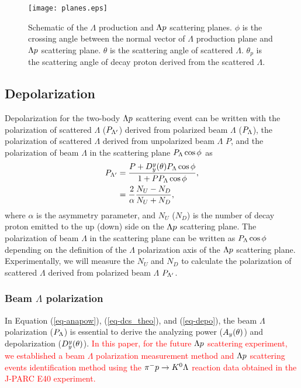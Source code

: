 \begin{figure}[h!]
 \begin{center}
   \texttt{[image: planes.eps]}
   \caption{Schematic of the $\Lambda$ production and $\Lambda p$ scattering planes. $\phi$ is the crossing angle between the normal vector of $\Lambda$ production plane and $\Lambda p$ scattering plane. $\theta$ is the scattering angle of scattered $\Lambda$. $\theta_{p}$ is the scattering angle of decay proton derived from the scattered $\Lambda$.}
   \label{fig-planes}
 \end{center}
\end{figure}

\subsection{Depolarization}
\label{sec-depo}

Depolarization for the two-body $\Lambda p$ scattering event can be written with the polarization of scattered $\Lambda$ ($P_{\Lambda'}$) derived from polarized beam $\Lambda$ ($P_{\Lambda}$), the polarization of scattered $\Lambda$ derived from unpolarized beam $\Lambda$ $P$, and the polarization of beam $\Lambda$ in the scattering plane $P_{\Lambda}\cos{\phi}$ as
\begin{align}
  P_{\Lambda'} &= \frac{P+D^{y}_{y}(\theta)P_{\Lambda}\cos{\phi}}{1+PP_{\Lambda}\cos{\phi}}, \\
  &= \frac{2}{\alpha} \frac{N_{U}-N_{D}}{N_{U}+N_{D}},
  \label{eq-depo}
\end{align}
where $\alpha$ is the asymmetry parameter, and $N_{U}$ ($N_{D}$) is the number of decay proton emitted to the up (down) side on the $\Lambda p$ scattering plane. The polarization of beam $\Lambda$ in the scattering plane can be written as $P_{\Lambda}\cos{\phi}$ depending on the definition of the $\Lambda$ polarization axis of the $\Lambda p$ scattering plane. Experimentally, we will measure the $N_{U}$ and $N_{D}$ to calculate the polarization of scattered $\Lambda$ derived from polarized beam $\Lambda$ $P_{\Lambda'}$. 

\subsubsection{Beam $\Lambda$ polarization}
In Equation (\ref{eq-anapow}), (\ref{eq-dcs_theo}), and (\ref{eq-depo}), the beam $\Lambda$ polarization ($P_{\Lambda}$) is essential to derive the analyzing power ($A_{y}(\theta)$) and depolarization ($D^{y}_{y}(\theta)$). \textcolor{red}{In this paper, for the future $\Lambda p$ scattering experiment, we established a beam $\Lambda$ polarization measurement method and $\Lambda p$ scattering events identification method using the $\pi^- p \to K^0 \Lambda$ reaction data obtained in the J-PARC E40 experiment.}


